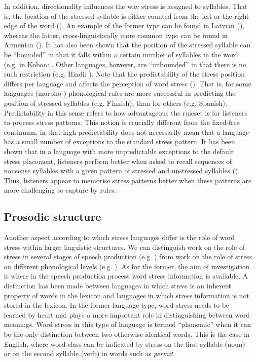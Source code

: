 In addition, directionality influences the way stress is assigned to syllables. That is, the location of the stressed syllable is either counted from the left or the right edge of the word (\citealt{howard_directional_1972}). An example of the former type can be found in Latvian (\citealt{halle_essay_1987}), whereas the latter, cross-linguistically more common type can be found in Armenian (\citealt{vaux_phonology_1998}). It has also been shown that the position of the stressed syllable can be ``bounded'' in that it falls within a certain number of syllables in the word (e.g. in Kobon: \citealt{kenstowicz_quality-sensitive_1997}. Other languages, however, are ``unbounded'' in that there is no such restriction (e.g. Hindi: \citealt{bailey_nonmetrical_1995}).
Note that the predictability of the stress position differs per language and affects the perception of word stress (\citealt{peperkamp_perception_2010}). That is, for some languages (morpho-) phonological rules are more successful in predicting the position of stressed syllables (e.g. Finnish), than for others (e.g. Spanish). Predictability in this sense refers to how advantageous the ruleset is for listeners to process stress patterns. This notion is crucially different from the fixed-free continuum, in that high predictability does not necessarily mean that a language has a small number of exceptions to the standard stress pattern. It has been shown that in a language with more unpredictable exceptions to the default stress placement, listeners perform better when asked to recall sequences of nonsense syllables with a given pattern of stressed and unstressed syllables (\citealt{peperkamp_perception_2010}). Thus, listeners appear to memorise stress patterns better when these patterns are more challenging to capture by rules.


\subsection{Prosodic structure} \label{sec113}
Another aspect according to which stress languages differ is the role of word stress within larger linguistic structures. We can distinguish work on the role of stress in several stages of speech production (e.g. \citealt{levelt_speaking_1989}) from work on the role of stress on different phonological levels (e.g. \citealt{nespor_prosodic_2007}). As for the former, the aim of investigation is where in the speech production process word stress information is available. A distinction has been made between languages in which stress is an inherent property of words in the lexicon and languages in which stress information is not stored in the lexicon. In the former language type, word stress needs to be learned by heart and plays a more important role in distinguishing between word meanings. Word stress in this type of language is termed ``phonemic'' when it can be the only distinction between two otherwise identical words. This is the case in English, where word class can be indicated by stress on the first syllable (noun) or on the second syllable (verb) in words such as \textit{permit}. \par 

